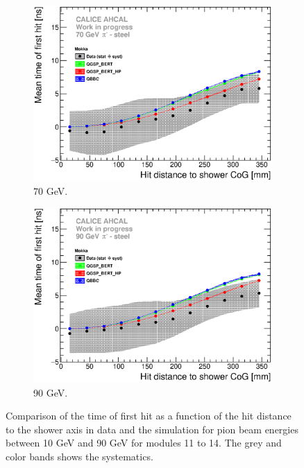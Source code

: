 \begin{figure}[htbp!]
\begin{subfigure}[t]{0.49\textwidth}
    \centering
    \includegraphics[width=1\textwidth]{../Thesis_Plots/Timing/Pions/Plots/ComparisonToSim/Time_Radius_70GeV_BL_Mokka.eps}
    \caption{70 GeV.} \label{fig:Radius_BL_SimData_70GeV}
  \end{subfigure}
  \hfill
  \begin{subfigure}[t]{0.49\textwidth}
    \centering
    \includegraphics[width=1\textwidth]{../Thesis_Plots/Timing/Pions/Plots/ComparisonToSim/Time_Radius_90GeV_BL_Mokka.eps}
    \caption{90 GeV.} \label{fig:Radius_BL_SimData_90GeV}
  \end{subfigure}
  \caption{Comparison of the time of first hit as a function of the hit distance to the shower axis in data and the \mokka simulation for pion beam energies between 10 GeV and 90 GeV for modules 11 to 14. The grey and color bands shows the systematics.}
\end{figure}

